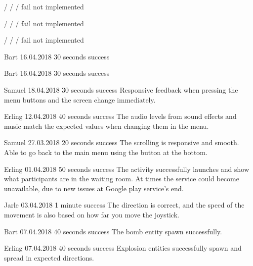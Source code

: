 {/}
{/}
{/}
{fail}
{not implemented}

{/}
{/}
{/}
{fail}
{not implemented}

{/}
{/}
{/}
{fail}
{not implemented}

{Bart}
{16.04.2018}
{30 seconds}
{success}
{}

{Bart}
{16.04.2018}
{30 seconds}
{success}
{}


{Samuel}
{18.04.2018}
{30 seconds}
{success}
{Responsive feedback when pressing the menu buttons and the screen change immediately.}

{Erling}
{12.04.2018}
{40 seconds}
{success}
{The audio levels from sound effects and music match the expected values when changing them in the menu.}

{Samuel}
{27.03.2018}
{20 seconds}
{success}
{The scrolling is responsive and smooth. Able to go back to the main menu using the button at the bottom.}

{Erling}
{01.04.2018}
{50 seconds}
{success}
{The activity successfully launches and show what participants are in the waiting room. At times the service could become unavailable, due to new issues at Google play service’s end.}

{Jarle}
{03.04.2018}
{1 minute}
{success}
{The direction is correct, and the speed of the movement is also based on how far you move the joystick.}

{Bart}
{07.04.2018}
{40 seconds}
{success}
{The bomb entity spawn successfully.}

{Erling}
{07.04.2018}
{40 seconds}
{success}
{Explosion entities successfully spawn and spread in expected directions.}

